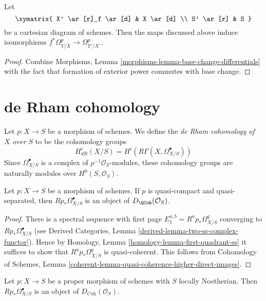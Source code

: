 \begin{lemma}
\label{lemma-base-change-de-rham}
Let
$$
\xymatrix{
X' \ar[r]_f \ar[d] & X \ar[d] \\
S' \ar[r] & S
}
$$
be a cartesian diagram of schemes. Then the maps discussed
above induce isomorphisms
$f^*\Omega^p_{Y/X} \to \Omega^p_{Y'/X'}$.
\end{lemma}

\begin{proof}
Combine Morphisms, Lemma \ref{morphisms-lemma-base-change-differentials}
with the fact that formation of exterior power commutes with base change.
\end{proof}





\section{de Rham cohomology}
\label{section-de-rham-cohomology}

\noindent
Let $p : X \to S$ be a morphism of schemes. We define the
{\it de Rham cohomology of $X$ over $S$} to be the cohomology
groups
$$
H^i_{dR}(X/S) = H^i(R\Gamma(X, \Omega^\bullet_{X/S}))
$$
Since $\Omega^\bullet_{X/S}$ is a complex of $p^{-1}\mathcal{O}_S$-modules,
these cohomology groups are naturally modules over $H^0(S, \mathcal{O}_S)$.

\begin{lemma}
\label{lemma-quasi-coherence-relative}
Let $p : X \to S$ be a morphism of schemes. If $p$ is quasi-compact
and quasi-separated, then $Rp_*\Omega^\bullet_{X/S}$ is an object
of $D_\QCoh(\mathcal{O}_S)$.
\end{lemma}

\begin{proof}
There is a spectral sequence with first page
$E_1^{a, b} = R^ap_*\Omega^q_{X/S}$ converging to $Rp_*\Omega^\bullet_{X/S}$
(see Derived Categories, Lemma \ref{derived-lemma-two-ss-complex-functor}).
Hence by Homology, Lemma \ref{homology-lemma-first-quadrant-ss}
it suffices to show that $R^ap_*\Omega^q_{X/S}$ is quasi-coherent.
This follows from Cohomology of Schemes, Lemma
\ref{coherent-lemma-quasi-coherence-higher-direct-images}.
\end{proof}

\begin{lemma}
\label{lemma-coherence-relative}
Let $p : X \to S$ be a proper morphism of schemes with $S$ locally
Noetherian. Then $Rp_*\Omega^\bullet_{X/S}$ is an object
of $D_{\textit{Coh}}(\mathcal{O}_S)$.
\end{lemma}

